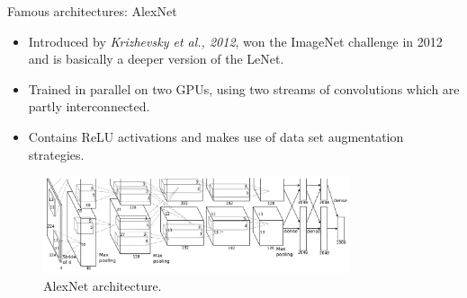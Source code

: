 \begin{vbframe}{Famous architectures: AlexNet}
  \begin{itemize}
    \item Introduced by \textit{Krizhevsky et al., 2012}, won the ImageNet challenge in 2012 and is basically a deeper version of the LeNet.
    \item Trained in parallel on two GPUs, using two streams of convolutions which are partly interconnected.
    \item Contains ReLU activations and makes use of data set augmentation strategies.
  \end{itemize}
  \begin{figure}
  \centering
    \includegraphics[width=9cm]{plots/architectures/alexnet.png}
    \caption{AlexNet architecture.}
  \end{figure}
\end{vbframe}
